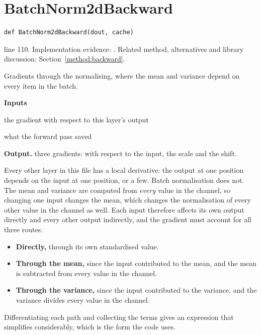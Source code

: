 \section{BatchNorm2dBackward}\label{fn:train:BatchNorm2dBackward}
\begin{lstlisting}[style=sig]
def BatchNorm2dBackward(dout, cache)
\end{lstlisting}
 line 110. Implementation evidence: \cite{code2026}. Related method, alternatives and library discussion: Section~\ref{method:backward}.


Gradients through the normalising, where the mean and variance depend on every item in the batch.




\noindent\textbf{Inputs}
\begin{description}[leftmargin=2.2em,style=nextline,font=\normalfont\ttfamily]\setlength\itemsep{1pt}
  \item[{dout}] \normalfont the gradient with respect to this layer's output
  \item[{cache}] \normalfont what the forward pass saved
\end{description}

\noindent\textbf{Output.} three gradients: with respect to the input, the scale and the shift.


Every other layer in this file has a local derivative: the output at one position depends on the input at one position, or a few. Batch normalisation does not. The mean and variance are computed from \emph{every} value in the channel, so changing one input changes the mean, which changes the normalisation of every other value in the channel as well. Each input therefore affects its own output directly and every other output indirectly, and the gradient must account for all three routes.



\begin{itemize}\setlength\itemsep{0pt}
  \item \textbf{Directly,} through its own standardised value.
  \item \textbf{Through the mean,} since the input contributed to the mean, and the mean is subtracted from every value in the channel.
  \item \textbf{Through the variance,} since the input contributed to the variance, and the variance divides every value in the channel.
\end{itemize}
Differentiating each path and collecting the terms gives an expression that simplifies considerably, which is the form the code uses.


